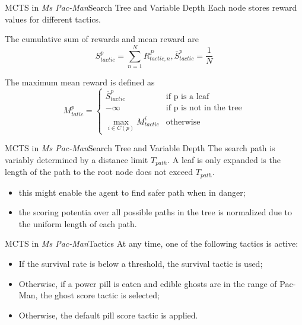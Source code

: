 \documentclass{beamer}
\begin{document}
  \begin{frame}{MCTS in \textit{Ms Pac-Man}}{Search Tree and Variable Depth}
    Each node stores reward values for different tactics.

    The cumulative sum of rewards and mean reward are
    \begin{equation} S^{p}_{tactic} = \sum_{n=1}^N R_{tactic,n}^P, \overline{S}^p_{tactic} = \frac{1}{N} \end{equation}

    The maximum mean reward is defined as
    \begin{equation}
      M^p_{tatic} = \begin{cases} \overline{S}^p_{tactic} & \text{if p is a leaf} \\
                                  -\infty & \text{if p is not in the tree} \\
                                  \max_{i \in C(p)} M^i_{tactic} & \text{otherwise}  \end{cases}
    \end{equation}
  \end{frame}

  \begin{frame}{MCTS in \textit{Ms Pac-Man}}{Search Tree and Variable Depth}
    The search path is variably determined by a distance limit $T_{path}$. A leaf is only expanded is the length of the path to the root node does not exceed $T_{path}$.
    \begin{itemize}
      \item this might enable the agent to find safer path when in danger; \par
      \item the scoring potentia over all possible paths in the tree is normalized due to the uniform length of each path.
    \end{itemize}
  \end{frame}

  \begin{frame}{MCTS in \textit{Ms Pac-Man}}{Tactics}
    At any time, one of the following tactics is active:
    \begin{itemize}
      \item If the survival rate is below a threshold, the survival tactic is used;
      \item Otherwise, if a power pill is eaten and edible ghosts are in the range of Pac-Man, the ghost score tactic is selected;
      \item Otherwise, the default pill score tactic is applied.
    \end{itemize}
  \end{frame}
\end{document}
